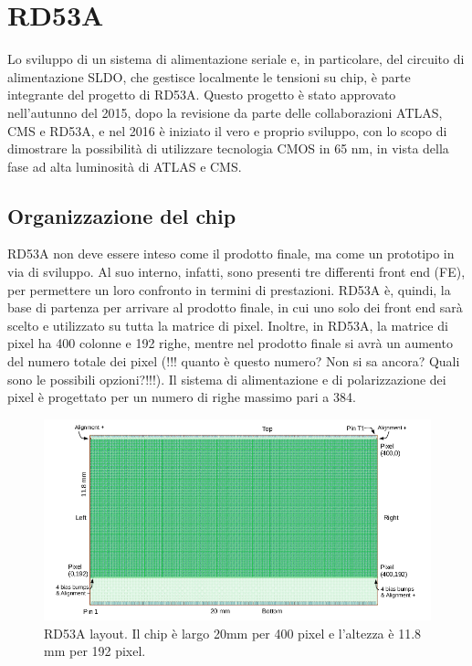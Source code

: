 \chapter{RD53A}

Lo sviluppo di un sistema di alimentazione seriale e, in particolare, del circuito di alimentazione SLDO, che gestisce localmente le tensioni su chip, è parte integrante del progetto di RD53A\cite{RD53A}.
Questo progetto è stato approvato nell'autunno del 2015, dopo la revisione da parte delle collaborazioni ATLAS, CMS e RD53A, e nel 2016 è iniziato il vero e proprio sviluppo, con lo scopo di dimostrare la possibilità di utilizzare tecnologia CMOS  in 65 nm, in vista della fase ad alta luminosità di ATLAS e CMS. 

\section{Organizzazione del chip} 
RD53A non deve essere inteso come il prodotto finale, ma come un prototipo in via di sviluppo.
Al suo interno, infatti, sono presenti tre differenti front end (FE), per permettere un loro confronto in termini di prestazioni.
RD53A è, quindi, la base di partenza per arrivare al prodotto finale, in cui uno solo dei front end sarà scelto e utilizzato su tutta la matrice di pixel.
Inoltre, in RD53A, la matrice di pixel ha 400 colonne e 192 righe, mentre nel prodotto finale si avrà un aumento del numero totale dei pixel (!!! quanto è questo numero? Non si sa ancora? Quali sono le possibili opzioni?!!!). 
Il sistema di alimentazione e di polarizzazione dei pixel è progettato per un numero di righe massimo pari a 384.%

\begin{figure}
\centering
\includegraphics[scale=.4]{Immagini/RD53ALayout}
\caption{RD53A layout. Il chip è largo 20mm per 400 pixel e l'altezza è 11.8 mm per 192 pixel.}
\label{RD53ALayout}
\end{figure}

